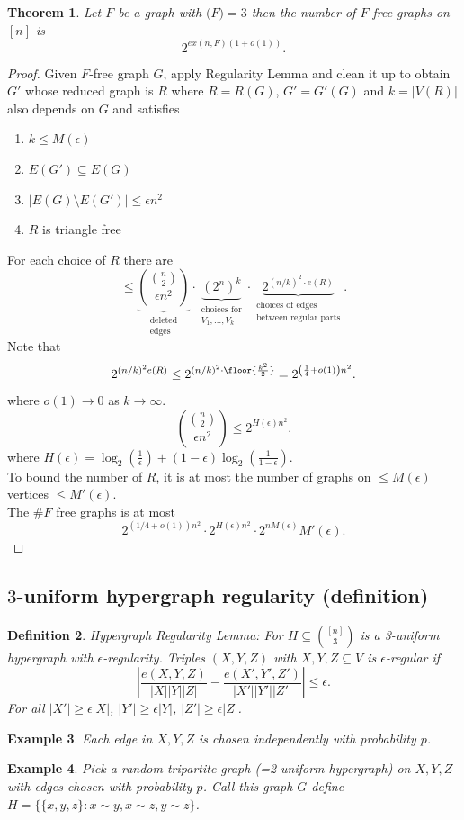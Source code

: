 \documentclass[a4paper]{article}
\newtheorem{thm}{Theorem}[section]
\newtheorem{defn}[thm]{Definition}
\newtheorem{eg}[thm]{Example}
\begin{document}
\begin{thm}
    Let $F$ be a graph with $\mathcal(F)=3$ then the number of $F$-free graphs on $[n]$ is 
    \[
    2^{ex(n,F)(1+o(1))}
    .\] 
\end{thm}
\begin{proof}
    Given $F$-free graph $G$, apply Regularity Lemma and clean it up to obtain $G'$ whose reduced graph is $R$ where $R=R(G)$, $G'=G'(G)$ and $k=|V(R)|$ also depends on $G$ and satisfies 
    \begin{enumerate}
        \item $k\leq M(\epsilon)$  
        \item $E(G')\subseteq E(G)$ 
        \item $|E(G)\setminus E(G')|\leq \epsilon n^2$
        \item $R$ is triangle free 
    \end{enumerate}
    For each choice of $R$ there are \[
    \leq \underbrace{\binom{\binom{n}{2}}{\epsilon n^2}}_{\substack{\text{deleted}\\\text{edges}}}
    \cdot \underbrace{(2^n)^k}_{\substack{\text{choices for}\\V_1,\dots,V_k}}
    \cdot \underbrace{2^{(n/k)^2\cdot e(R)}}_{\substack{\text{choices of edges}\\\text{between regular parts}}}
    .\]
    Note that \[
    2^{(n/k)^2e(R)}\leq 2^{(n/k)^2\cdot \floor{ \frac{k^2}{2}}}=2^{ \left( \frac{1}{4}+o(1) \right)n^2}
    .\] 
    where $o(1)\to 0$ as $k\to \infty$. 
    \[
    {{n \choose 2} \choose \epsilon n^2}\leq 2^{H(\epsilon)n^2}
    .\] 
    where $H(\epsilon)=\log_2 \left( \frac{1}{\epsilon} \right)+(1-\epsilon)\log_2 \left( \frac{1}{1-\epsilon} \right)$.\\
    To bound the number of $R$, it is at most the number of graphs on $\leq M(\epsilon)$ vertices $\leq M'(\epsilon)$. \\
    The $\# F$ free graphs is at most \[
    2^{(1/4+o(1))n^2}\cdot 2^{H(\epsilon)n^2}\cdot 2^{n M(\epsilon)}M'(\epsilon)
    .\] 
\end{proof}

\subsection{$3$-uniform hypergraph regularity (definition)}

\begin{defn}
    Hypergraph Regularity Lemma: For $H\subseteq {[n] \choose 3}$ is a 3-uniform hypergraph with $\epsilon$-regularity. Triples $(X,Y,Z)$ with $X,Y,Z\subseteq V$ is $\epsilon$-regular if \[
    \left |\frac{e(X,Y,Z)}{|X||Y||Z|}-\frac{e(X',Y',Z')}{|X'||Y'||Z'|} \right | \leq \epsilon
    .\] 
    For all $|X'|\geq \epsilon |X|$, $|Y'|\geq \epsilon |Y|$, $|Z'|\geq \epsilon |Z|$. 
\end{defn}
\begin{eg}
    Each edge in $X,Y,Z$ is chosen independently with probability $p$. 
\end{eg}
\begin{eg}
    Pick a random tripartite graph (=2-uniform hypergraph) on $X,Y,Z$ with edges chosen with probability $p$. Call this graph $G$ define $H= \{ \{x,y,z\}:x\sim y, x\sim z, y \sim z\}$.
\end{eg}
\newpage
\end{document}
